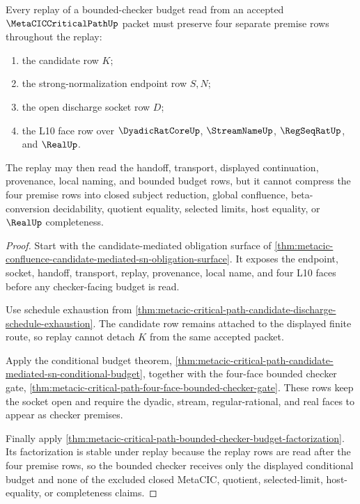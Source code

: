 \begin{theorem}
\label{thm:metacic-critical-path-bounded-checker-replay-separation}
Every replay of a bounded-checker budget read from an accepted $\MetaCICCriticalPathUp$ packet must preserve four separate premise rows throughout the replay:
\begin{enumerate}
\item the candidate row $K$;
\item the strong-normalization endpoint row $S,N$;
\item the open discharge socket row $D$;
\item the L10 face row over $\DyadicRatCoreUp$, $\StreamNameUp$, $\RegSeqRatUp$, and $\RealUp$.
\end{enumerate}
The replay may then read the handoff, transport, displayed continuation, provenance, local naming, and bounded budget rows, but it cannot compress the four premise rows into closed subject reduction, global confluence, beta-conversion decidability, quotient equality, selected limits, host equality, or $\RealUp$ completeness.
\end{theorem}
\begin{proof}
Start with the candidate-mediated obligation surface of \autoref{thm:metacic-confluence-candidate-mediated-sn-obligation-surface}. It exposes the endpoint, socket, handoff, transport, replay, provenance, local name, and four L10 faces before any checker-facing budget is read.

Use schedule exhaustion from \autoref{thm:metacic-critical-path-candidate-discharge-schedule-exhaustion}. The candidate row remains attached to the displayed finite route, so replay cannot detach $K$ from the same accepted packet.

Apply the conditional budget theorem, \autoref{thm:metacic-critical-path-candidate-mediated-sn-conditional-budget}, together with the four-face bounded checker gate, \autoref{thm:metacic-critical-path-four-face-bounded-checker-gate}. These rows keep the socket open and require the dyadic, stream, regular-rational, and real faces to appear as checker premises.

Finally apply \autoref{thm:metacic-critical-path-bounded-checker-budget-factorization}. Its factorization is stable under replay because the replay rows are read after the four premise rows, so the bounded checker receives only the displayed conditional budget and none of the excluded closed MetaCIC, quotient, selected-limit, host-equality, or completeness claims.
\end{proof}

